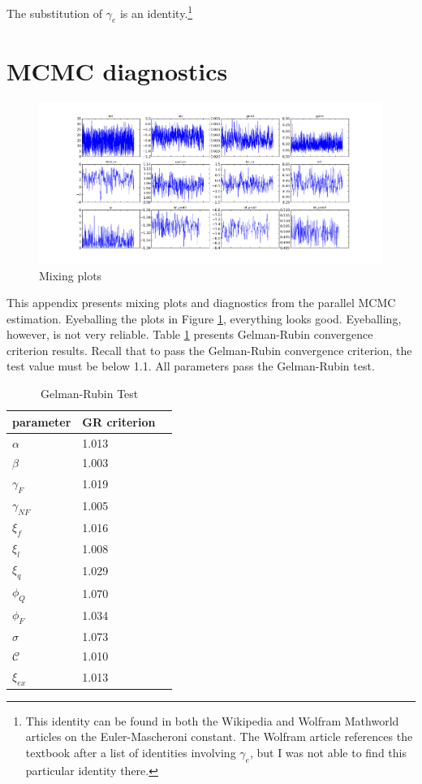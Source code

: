 The substitution of $\gamma_e$ is an identity.\footnote{This identity can be found in both the Wikipedia and Wolfram Mathworld articles on the Euler-Mascheroni constant.  The Wolfram article references the textbook \citet{whittaker1996course} after a list of identities involving $\gamma_e$, but I was not able to find this particular identity there.}

\section{MCMC diagnostics}
\label{sec:MCMC_diag}

\begin{figure}[h!]
    \includegraphics{pics/params_plots_big.png}
    \caption{Mixing plots}
    \label{fig:mix}
\end{figure}

This appendix presents mixing plots and diagnostics from the parallel
MCMC estimation. Eyeballing the plots in Figure \ref{fig:mix}, everything looks good.  Eyeballing,
however, is not very reliable.
Table \ref{tab:grtest} presents Gelman-Rubin convergence criterion results. Recall that to pass the
Gelman-Rubin convergence criterion, the test value must be below 1.1.
All parameters pass the Gelman-Rubin test.

\begin{table}[h!]
    \centering
    \begin{tabular}{|l|l|l|}
        \hline
        parameter       & GR criterion \\ \hline
        $\alpha$        & 1.013  \\
        $\beta$         & 1.003  \\
        $\gamma_{F}$    & 1.019  \\
        $\gamma_{NF}$   & 1.005  \\
        $\xi_f$         & 1.016  \\
        $\xi_l$         & 1.008  \\
        $\xi_q$         & 1.029  \\
        $\phi_Q$        & 1.070  \\
        $\phi_F$        & 1.034  \\
        $\sigma$        & 1.073  \\
        $\mathcal{C}$   & 1.010  \\
        $\xi_{ex}$      & 1.013  \\ \hline
    \end{tabular}
    \caption{Gelman-Rubin Test}
    \label{tab:grtest}
\end{table}

